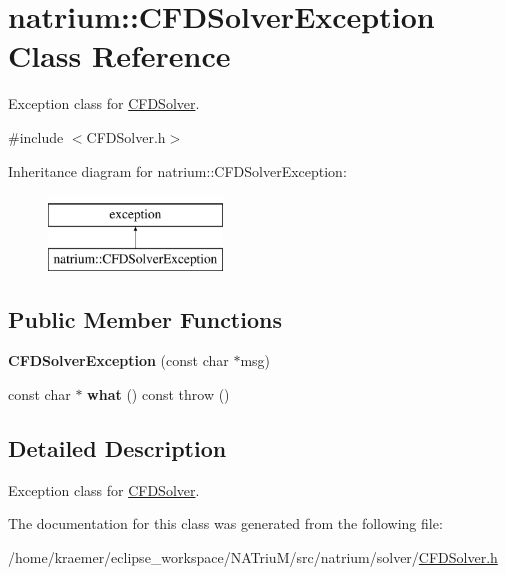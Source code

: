\hypertarget{classnatrium_1_1CFDSolverException}{\section{natrium\-:\-:C\-F\-D\-Solver\-Exception Class Reference}
\label{classnatrium_1_1CFDSolverException}
}


Exception class for \hyperlink{classnatrium_1_1CFDSolver}{C\-F\-D\-Solver}.  




{\ttfamily \#include $<$C\-F\-D\-Solver.\-h$>$}

Inheritance diagram for natrium\-:\-:C\-F\-D\-Solver\-Exception\-:\begin{figure}[H]
\begin{center}
\leavevmode
\includegraphics[height=2.000000cm]{classnatrium_1_1CFDSolverException}
\end{center}
\end{figure}
\subsection*{Public Member Functions}
\begin{DoxyCompactItemize}
\item 
\hypertarget{classnatrium_1_1CFDSolverException_a1256570132b679d57fe046f648656051}{{\bfseries C\-F\-D\-Solver\-Exception} (const char $\ast$msg)}\label{classnatrium_1_1CFDSolverException_a1256570132b679d57fe046f648656051}

\item 
\hypertarget{classnatrium_1_1CFDSolverException_ae1e5d3d088b808ab4c995d1209a86a1f}{const char $\ast$ {\bfseries what} () const   throw ()}\label{classnatrium_1_1CFDSolverException_ae1e5d3d088b808ab4c995d1209a86a1f}

\end{DoxyCompactItemize}


\subsection{Detailed Description}
Exception class for \hyperlink{classnatrium_1_1CFDSolver}{C\-F\-D\-Solver}. 

The documentation for this class was generated from the following file\-:\begin{DoxyCompactItemize}
\item 
/home/kraemer/eclipse\-\_\-workspace/\-N\-A\-Triu\-M/src/natrium/solver/\hyperlink{CFDSolver_8h}{C\-F\-D\-Solver.\-h}\end{DoxyCompactItemize}
